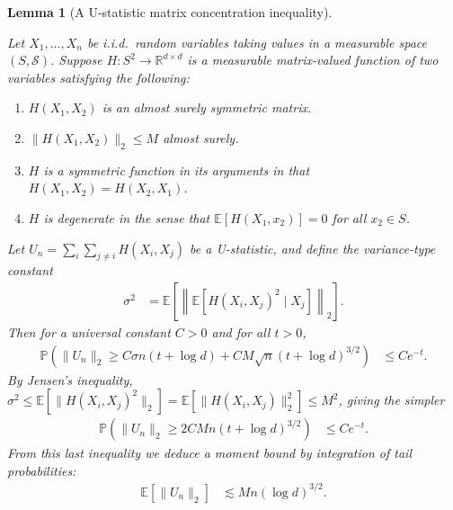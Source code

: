 \documentclass[11pt,lof]{puthesis}
\renewcommand{\P}{\ensuremath{\mathbb{P}}}
\newcommand{\R}{\ensuremath{\mathbb{R}}}
\newcommand{\E}{\ensuremath{\mathbb{E}}}
\newcommand{\cS}{\ensuremath{\mathcal{S}}}
\theoremstyle{break}
\newtheorem{lemma}{Lemma}[section]
\theoremstyle{proof}
\begin{document}
\begin{lemma}[A U-statistic matrix concentration inequality]
  \label{lem:kernel_app_ustat_matrix_concentration}

  Let $X_1, \ldots, X_n$ be i.i.d.\ random variables
  taking values in a measurable space $(S, \cS)$.
  Suppose $H: S^2 \to \R^{d \times d}$ is a measurable matrix-valued function of
  two variables satisfying the following:
  \begin{enumerate}[label=(\roman*)]

    \item
      $H(X_1, X_2)$ is an almost surely symmetric matrix.

    \item
      $\|H(X_1, X_2)\|_2 \leq M$ almost surely.

    \item
      $H$ is a symmetric function in its arguments in that
      $H(X_1, X_2) = H(X_2, X_1)$.

    \item
      $H$ is degenerate in the sense that
      $\E[H(X_1, x_2)] = 0$ for all $x_2 \in S$.

  \end{enumerate}
  Let $U_n = \sum_i \sum_{j \neq i} H(X_i, X_j)$
  be a U-statistic,
  and define the variance-type constant
  \begin{align*}
    \sigma^2
    &=
    \E\left[
      \left\|
      \E\left[
        H(X_i, X_j)^2
        \mid X_j
      \right]
      \right\|_2
    \right].
  \end{align*}
  Then for a universal constant $C > 0$
  and for all $t > 0$,
  \begin{align*}
    \P\left(
      \|U_n\|_2
      \geq
      C \sigma n (t + \log d)
      + C M \sqrt{n} (t + \log d)^{3/2}
    \right)
    &\leq
    C e^{-t}.
  \end{align*}
  By Jensen's inequality,
  $\sigma^2 \leq \E[ \| H(X_i, X_j)^2 \|_2 ]
  = \E[ \| H(X_i, X_j) \|_2^2 ] \leq M^2$, giving the simpler
  \begin{align*}
    \P\left(
      \|U_n\|_2
      \geq
      2 C M n
      (t + \log d)^{3/2}
    \right)
    &\leq
    C e^{-t}.
  \end{align*}
  From this last inequality we deduce a moment bound
  by integration of tail probabilities:
  \begin{align*}
    \E\left[
      \|U_n\|_2
    \right]
    &\lesssim
    M n (\log d)^{3/2}.
  \end{align*}

\end{lemma}
\end{document}
